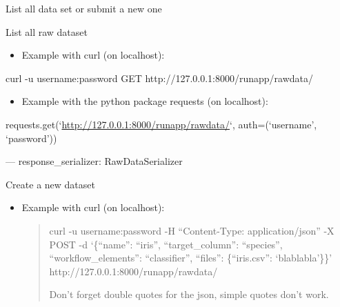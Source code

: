 \documentclass[letterpaper,10pt,english]{sphinxmanual}
\begin{document}

\begin{fulllineitems}
\label{modules/views:runapp.views.RawDataList}
List all data set or submit a new one

\begin{fulllineitems}
\label{modules/views:runapp.views.RawDataList.get}
List all raw dataset
\begin{itemize}
\item {} 
Example with curl (on localhost):

\end{itemize}

curl -u username:password GET http://127.0.0.1:8000/runapp/rawdata/
\begin{itemize}
\item {} 
Example with the python package requests (on localhost):

\end{itemize}

requests.get(`\url{http://127.0.0.1:8000/runapp/rawdata/}`,            auth=(`username', `password'))

---
response\_serializer: RawDataSerializer

\end{fulllineitems}


\begin{fulllineitems}
\label{modules/views:runapp.views.RawDataList.post}
Create a new dataset
\begin{itemize}
\item {} 
Example with curl (on localhost):
\begin{quote}

curl -u username:password   -H ``Content-Type: application/json''            -X POST            -d `\{``name'': ``iris'', ``target\_column'': ``species'',                 ``workflow\_elements'': ``classifier'',                 ``files'': \{``iris.csv'': `blablabla'\}\}'                http://127.0.0.1:8000/runapp/rawdata/

Don't forget double quotes for the json, simple quotes don't work.
\end{quote}


\end{itemize}
\end{fulllineitems}
\end{fulllineitems}
\end{document}
